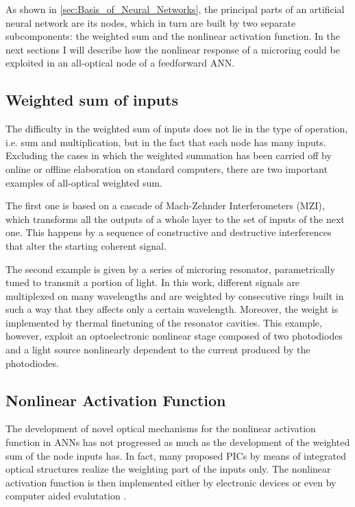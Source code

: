 As shown in \autoref{sec:Basis_of_Neural_Networks}, the principal parts of an artificial neural network are its nodes, which in turn are built by two separate subcomponents: the weighted sum and the nonlinear activation function.
In the next sections I will describe how the nonlinear response of a microring could be exploited in an all-optical node of a feedforward ANN.

\subsection{Weighted sum of inputs}
\label{ssec:Weighted_Sum_of_inputs}
The difficulty in the weighted sum of inputs does not lie in the type of operation, i.e. sum and multiplication, but in the fact that each node has many inputs.
Excluding the cases in which the weighted summation has been carried off by online or offline elaboration on standard computers, there are two important examples of all-optical weighted sum.

The first one \cite{Shen2017} is based on a cascade of Mach-Zehnder Interferometers (MZI), which transforms all the outputs of a whole layer to the set of inputs of the next one.
This happens by a sequence of constructive and destructive interferences that alter the starting coherent signal.

The second example \cite{Tait2017} is given by a series of microring resonator, parametrically tuned to transmit a portion of light.
In this work, different signals are multiplexed on many wavelengths and are weighted by consecutive rings built in such a way that they affects only a certain wavelength.
Moreover, the weight is implemented by thermal finetuning of the resonator cavities.
This example, however, exploit an optoelectronic nonlinear stage composed of two photodiodes and a light source nonlinearly dependent to the current produced by the photodiodes.

\subsection{Nonlinear Activation Function}
\label{ssec:Nonlinear_Activation_Function}
The development of novel optical mechanisms for the nonlinear activation function in ANNs has not progressed as much as the development of the weighted sum of the node inputs has.
In fact, many proposed PICs by means of integrated optical structures realize the weighting part of the inputs only.
The nonlinear activation function is then implemented either by electronic devices \cite{Tait2017} or even by computer aided evalutation \cite{Shen2017}.

